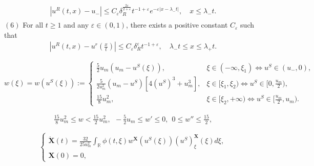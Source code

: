 \documentclass[10pt,a4paper]{amsart}
\begin{document}
\begin{lemma}
\begin{align*}
\begin{array}{l}
				\left|u^{R}(t, x)-u_{-}\right| \leq C_{\varepsilon} \delta_{R}^{\frac{2 \varepsilon}{2+\varepsilon}} t^{-1+\varepsilon} e^{-\varepsilon\left|x-\lambda_{-} t\right|}, \quad x \leq \lambda_{-} t.
			\end{array}
		\end{align*}
		$(6)$ For all \( t \geq 1 \) and any \( \varepsilon \in(0,1) \), there exists a positive constant \( C_{\varepsilon} \) such that
		\begin{align*}
			\left|u^{R}(t, x)-u^{r}\left(\frac{x}{t}\right)\right| \leq C_{\varepsilon} \delta_{R}^{\varepsilon} t^{-1+\varepsilon}, \quad \lambda_{-} t \leq x \leq \lambda_{+} t .
		\end{align*}
	\end{lemma}

	\begin{equation} \label{WF}
		w(\xi)=w(u^{S}(\xi)) := \begin{cases}
			\frac{5}{2}u_{m}(u_{m} - u^{S}(\xi)), & \xi \in (-\infty, \xi_{1}) \iff u^{S} \in (u_{-}, 0), \\
			\frac{5}{2u_{m}^{2}}(u_{m} - u^{S})[4(u^{S})^{3} + u_{m}^{3}], & \xi \in [\xi_{1}, \xi_{2}) \iff u^{S} \in [0, \frac{u_{m}}{2}), \\
			\frac{15}{8}u_{m}^{2}, & \xi \in [\xi_{2}, +\infty) \iff u^{S} \in [\frac{u_{m}}{2}, u_{m}).
		\end{cases} 
	\end{equation}

	\begin{equation} \label{WFP}
		\begin{aligned}
			\frac{15}{8}u_m^2 \leq w < \frac{15}{2}u_m^2,\ \ 
			-\frac{5}{2}u_m \leq w' \leq 0,\ \ 
			0 \leq w'' \leq \frac{15}{2}, 
		\end{aligned}
	\end{equation}

	\begin{equation} \label{shift}
		\begin{cases}
			\dot{\mathbf{X}}(t) = \frac{32}{25u_m^2}\int_{\mathbb{R}}\phi(t, \xi)w^{\mathbf{X}}(u^S(\xi))(u^S)_{\xi}^{\mathbf{X}}(\xi)d\xi, \\
			\mathbf{X}(0) = 0,
		\end{cases} 
	\end{equation}
\end{document}
